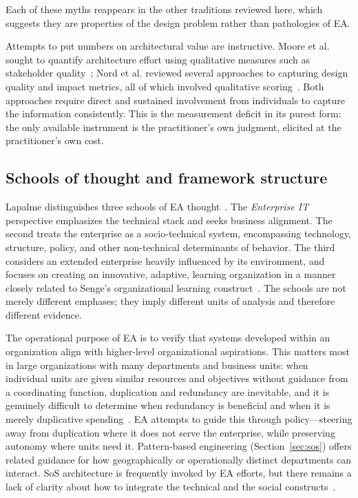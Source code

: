 \documentclass[11pt,a4paper]{article}
\begin{document}
Each of these myths reappears in the other traditions reviewed here, which
suggests they are properties of the design problem rather than pathologies of EA.

Attempts to put numbers on architectural value are instructive. Moore et al.
sought to quantify architecture effort using qualitative measures such as
stakeholder quality~\citep{moore2003}; Nord et al. reviewed several approaches
to capturing design quality and impact metrics, all of which involved
qualitative scoring~\citep{nord2014}. Both approaches require direct and
sustained involvement from individuals to capture the information consistently.
This is the measurement deficit in its purest form: the only available instrument
is the practitioner's own judgment, elicited at the practitioner's own cost.

\subsection{Schools of thought and framework structure}

Lapalme distinguishes three schools of EA thought~\citep{lapalme2012}. The
\emph{Enterprise IT} perspective emphasizes the technical stack and seeks
business alignment. The second treats the enterprise as a socio-technical
system, encompassing technology, structure, policy, and other non-technical
determinants of behavior. The third considers an extended enterprise heavily
influenced by its environment, and focuses on creating an innovative, adaptive,
learning organization in a manner closely related to Senge's organizational
learning construct~\citep{senge2018}. The schools are not merely different
emphases; they imply different units of analysis and therefore different
evidence.

The operational purpose of EA is to verify that systems developed within an
organization align with higher-level organizational aspirations. This matters
most in large organizations with many departments and business units: when
individual units are given similar resources and objectives without guidance
from a coordinating function, duplication and redundancy are inevitable, and it
is genuinely difficult to determine when redundancy is beneficial and when it is
merely duplicative spending~\citep{dunne2018}. EA attempts to guide this through
policy---steering away from duplication where it does not serve the enterprise,
while preserving autonomy where units need it. Pattern-based engineering
(Section~\ref{sec:sos}) offers related guidance for how geographically or
operationally distinct departments can interact. SoS architecture is frequently
invoked by EA efforts, but there remains a lack of clarity about how to
integrate the technical and the social
constructs~\citep{lapalme2012,nielsen2015}.
\end{document}
